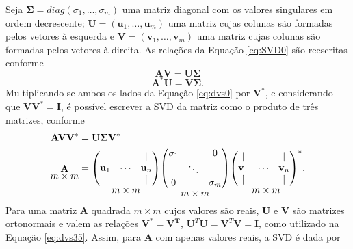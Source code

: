 Seja $\mathbf{\Sigma} = diag\left(\sigma_1, \dots, \sigma_m \right)$ uma matriz diagonal com os valores singulares em ordem decrescente; $\mathbf{U} = (\mathbf{u}_1,\dots, \mathbf{u}_m)$ uma matriz cujas colunas são formadas pelos vetores à esquerda e $\mathbf{V} = (\mathbf{v}_1,\dots, \mathbf{v}_m)$ uma matriz cujas colunas são formadas pelos vetores à direita. As relações da Equação \eqref{eq:SVD0} são reescritas conforme
\begin{equation}
\mathbf{A} \mathbf{V} =\mathbf{U} \mathbf{\Sigma} 
\label{eq:dvs0}
\end{equation}
\begin{equation}
\mathbf{A} ^{*}\mathbf{U}= \mathbf{V} \mathbf{\Sigma}. \label{eq:dvs1}
\end{equation}
Multiplicando-se ambos os lados da Equação \eqref{eq:dvs0} por $\mathbf{V}^*$, e considerando que $\mathbf{V} \mathbf{V}^* = \mathbf{I}$, é possível escrever a SVD da matriz como o produto de três matrizes, conforme
\begin{equation}
\begin{aligned}
\mathbf{A} \mathbf{V} \mathbf{V}^* & = \mathbf{U} \mathbf{\Sigma} \mathbf{V}^* \\
{\mathop{\mathbf{A}}_{\textstyle m \times m}}  & = {\mathop{\begin{pmatrix}
\vert & & \vert\\
\mathbf{u}_1 & \cdots & \mathbf{u}_n\\
\vert & & \vert\\
\end{pmatrix}}_{\textstyle m \times m}}
{\mathop{\begin{pmatrix}
\sigma_1 & & 0\\
& \ddots & \\
0 & & \sigma_m\\
\end{pmatrix}}_{\textstyle m \times m}}
{\mathop{\begin{pmatrix}
\vert & & \vert\\
\mathbf{v}_1 & \cdots & \mathbf{v}_n\\
\vert & & \vert\\
\end{pmatrix}^{*}}_{\textstyle m \times m}}.
\end{aligned}
\label{eq:dvs35}
\end{equation}
Para uma matriz $\mathbf{A}$ quadrada $m \times m$ cujos valores são reais, $\mathbf{U}$ e $ \mathbf{V}$ são matrizes ortonormais e valem as relações $ \mathbf{V^{*}} = \mathbf{V^{T}}$, $\mathbf{U}^T \mathbf{U} = \mathbf{V}^T \mathbf{V} = \mathbf{I} $, como utilizado na Equação \eqref{eq:dvs35}. Assim, para $\mathbf{A}$ com apenas valores reais, a SVD é dada por  
